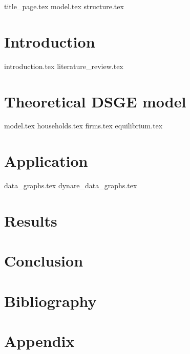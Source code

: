 \documentclass[12pt]{article}
\begin{document}
\begin{sloppypar}
{title_page.tex}
{model.tex}
\pagebreak
{structure.tex}
\pagebreak
{}
\section{Introduction}
{introduction.tex}
{literature_review.tex}

\section{Theoretical DSGE model}
{model.tex}
{households.tex}
{firms.tex}
{equilibrium.tex}
\section{Application} \label{application}
{data_graphs.tex}
{dynare_data_graphs.tex}
\section{Results}
\section{Conclusion}
\section{Bibliography}
\printbibliography
\section{Appendix}
\end{sloppypar}
\end{document}
